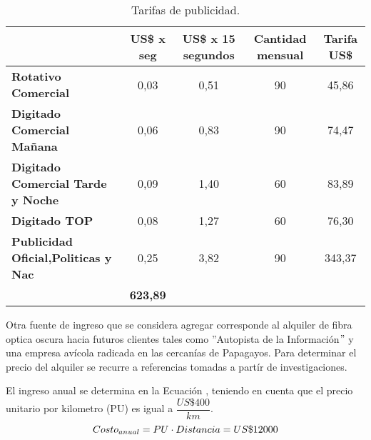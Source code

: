 \begin{itemize}
\begin{table}[H]
  \tiny
  \centering
    \begin{tabular}{|cccc|c|}
    \hline
    \rowcolor[rgb]{ .773,  .851,  .945} \multicolumn{1}{|c|}{\textbf{Publicidad}} & \multicolumn{1}{c|}{\textbf{US\$ x seg}} & \multicolumn{1}{c|}{\textbf{US\$ x 15 segundos}} & \textbf{Cantidad mensual} & \textbf{Tarifa US\$} \bigstrut\\
    \hline
    \multicolumn{1}{|l|}{\textbf{Rotativo Comercial}} & \multicolumn{1}{c|}{0,03} & \multicolumn{1}{c|}{0,51} & 90    & 45,86 \bigstrut\\
    \hline
    \multicolumn{1}{|l|}{\textbf{Digitado Comercial Mañana}} & \multicolumn{1}{c|}{0,06} & \multicolumn{1}{c|}{0,83} & 90    & 74,47 \bigstrut\\
    \hline
    \multicolumn{1}{|l|}{\textbf{Digitado Comercial Tarde y Noche}} & \multicolumn{1}{c|}{0,09} & \multicolumn{1}{c|}{1,40} & 60    & 83,89 \bigstrut\\
    \hline
    \multicolumn{1}{|l|}{\textbf{Digitado TOP}} & \multicolumn{1}{c|}{0,08} & \multicolumn{1}{c|}{1,27} & 60    & 76,30 \bigstrut\\
    \hline
    \multicolumn{1}{|l|}{\textbf{Publicidad Oficial,Politicas y Nac}} & \multicolumn{1}{c|}{0,25} & \multicolumn{1}{c|}{3,82} & 90    & 343,37 \bigstrut\\
    \hline
    \rowcolor[rgb]{ .773,  .851,  .945} \multicolumn{4}{|c|}{\textbf{Total mensual}} & \textbf{623,89} \bigstrut\\
    \hline
    \end{tabular}%
	\caption{Tarifas de publicidad.}
  \label{tab:tarifas-publicidad}%
\end{table}%




\end{itemize}


Otra fuente de ingreso que se considera agregar corresponde al alquiler de fibra optica oscura hacia futuros clientes tales como ''Autopista de la Información$"$
y una empresa avícola radicada en las cercanías de Papagayos. Para determinar el precio del alquiler se recurre a referencias tomadas a partír de investigaciones.

El ingreso anual se determina en la Ecuación , teniendo en cuenta que el precio unitario por kilometro (PU) es igual a $\dfrac{US\$ 400}{km}$.
\begin{equation}
 Costo_{anual} = PU \cdot Distancia \\ 
 = US\$ 12000
\end{equation}



